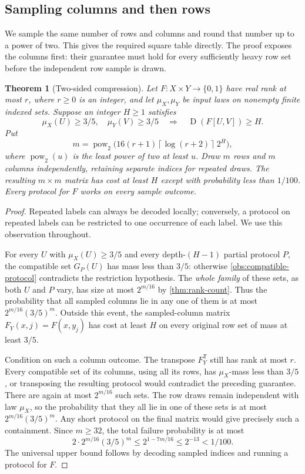 \documentclass[11pt]{article} \usepackage[utf8]{inputenc}
\theoremstyle{plain} \newtheorem{theorem}{Theorem}[section]
\theoremstyle{definition} \newaliascnt{definition}{theorem}
\newcommand{\D}{\operatorname{D}}
\newcommand{\ceil}[1]{\left\lceil#1\right\rceil}
\begin{document}
\subsection{Sampling columns and then rows}
\label{sec:sampling}

We sample the same number of rows and columns and round that number up to a
power of two. This gives the required square table directly. The proof exposes
the columns first: their guarantee must hold for every sufficiently heavy row
set before the independent row sample is drawn.

\begin{theorem}[Two-sided compression]\label{thm:compression}
Let $F:X\times Y\to\{0,1\}$ have real rank at most $r$, where $r\ge0$ is an
integer, and let $\mu_X,\mu_Y$ be input laws on nonempty finite indexed sets.
Suppose an integer $H\ge1$ satisfies
\[
\mu_X(U)\ge3/5,\quad\mu_Y(V)\ge3/5
\quad\Longrightarrow\quad \D(F[U,V])\ge H.
\]
Put
\[
m=\operatorname{pow}_2\bigl(16(r+1)\ceil{\log(r+2)}\,2^H\bigr),
\]
where $\operatorname{pow}_2(u)$ is the least power of two at least $u$.
Draw $m$ rows and $m$ columns independently, retaining separate indices for
repeated draws. The resulting $m\times m$ matrix has cost at least $H$ except
with probability less than $1/100$. Every protocol for $F$ works on every
sample outcome.
\end{theorem}
\begin{proof}
Repeated labels can always be decoded locally; conversely, a protocol on
repeated labels can be restricted to one occurrence of each label. We use this
observation throughout.

For every $U$ with $\mu_X(U)\ge3/5$ and every depth-$(H-1)$ partial protocol
$P$, the compatible set $G_P(U)$ has mass less than $3/5$: otherwise
\cref{obs:compatible-protocol} contradicts the restriction hypothesis. The
\emph{whole family} of these sets, as both $U$ and $P$ vary, has size at most
$2^{m/16}$ by \cref{thm:rank-count}. Thus the probability that all sampled
columns lie in any one of them is at most $2^{m/16}(3/5)^m$.
Outside this event, the sampled-column matrix
$F_Y(x,j)=F(x,y_j)$ has cost at least $H$ on every original row set of mass at
least $3/5$.

Condition on such a column outcome. The transpose $F_Y^{\mathsf T}$ still has
rank at most $r$. Every compatible set of its columns, using all its rows,
has $\mu_X$-mass less than $3/5$, or transposing the resulting protocol would
contradict the preceding guarantee. There are again at most $2^{m/16}$ such sets.
The row draws remain independent with law $\mu_X$, so the probability that
they all lie in one of these sets is at most $2^{m/16}(3/5)^m$. Any short protocol
on the final matrix would give precisely such a containment. Since $m\ge32$,
the total failure probability is at most
\[
2\cdot2^{m/16}(3/5)^m\le2^{1-7m/16}\le2^{-13}<1/100.
\]
The universal upper bound follows by decoding sampled indices and running a
protocol for $F$.
\end{proof}
\end{document}
